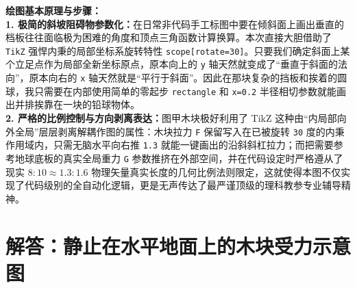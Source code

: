 {\small\color{blue!70!black}
\textbf{绘图基本原理与步骤：}\\
\textbf{1. 极简的斜坡阻碍物参数化：}在日常非代码手工标图中要在倾斜面上画出垂直的档板往往面临极为困难的角度和顶点三角函数计算换算。本次直接大胆借助了 \texttt{TikZ} 强悍内秉的局部坐标系旋转特性 \texttt{scope[rotate=30]}。只要我们确定斜面上某个立足点作为局部全新坐标原点，原本向上的 \texttt{y} 轴天然就变成了“垂直于斜面的法向”，原本向右的 \texttt{x} 轴天然就是“平行于斜面”。因此在那块复杂的挡板和挨着的圆球，我只需要在内部使用简单的零起步 \texttt{rectangle} 和 \texttt{x=0.2} 半径相切参数就能画出并排挨靠在一块的铅球物体。\\
\textbf{2. 严格的比例控制与方向剥离表达：}图甲木块极好利用了 TikZ 这种由“内局部向外全局”层层剥离解耦作图的属性：木块拉力 \texttt{F} 保留写入在已被旋转 \texttt{30} 度的内秉作用域内，只需无脑水平向右推 \texttt{1.3} 就能一键画出的沿斜斜杠拉力；而把需要参考地球底板的真实全局重力 \texttt{G} 参数推挤在外部空间，并在代码设定时严格遵从了现实 $8:10 \approx 1.3:1.6$ 物理矢量真实长度的几何比例法则限定，这就使得本图不仅实现了代码级别的全自动化逻辑，更是无声传达了最严谨顶级的理科教参专业辅导精神。
}



\section{解答：静止在水平地面上的木块受力示意图}

\vspace{0.6cm}

\begin{center}
\end{center}

